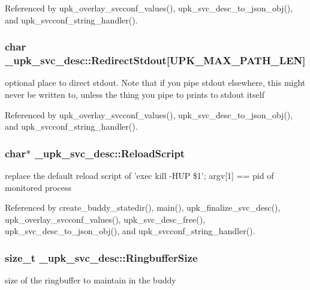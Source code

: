 Referenced by upk\_\-overlay\_\-svcconf\_\-values(), upk\_\-svc\_\-desc\_\-to\_\-json\_\-obj(), and upk\_\-svcconf\_\-string\_\-handler().

\subsubsection[{RedirectStdout}]{\setlength{\rightskip}{0pt plus 5cm}char {\bf \_\-upk\_\-svc\_\-desc::RedirectStdout}[UPK\_\-MAX\_\-PATH\_\-LEN]}\label{struct__upk__svc__desc_a2bfed4f3da2a85d7af160f64a70056dc}
optional place to direct stdout. Note that if you pipe stdout elsewhere, this might never be written to, unless the thing you pipe to prints to stdout itself 

Referenced by upk\_\-overlay\_\-svcconf\_\-values(), upk\_\-svc\_\-desc\_\-to\_\-json\_\-obj(), and upk\_\-svcconf\_\-string\_\-handler().

\subsubsection[{ReloadScript}]{\setlength{\rightskip}{0pt plus 5cm}char$\ast$ {\bf \_\-upk\_\-svc\_\-desc::ReloadScript}}\label{struct__upk__svc__desc_afa1e0a64af10238755e4c6716814be96}
replace the default reload script of 'exec kill -\/HUP \$1'; argv[1] == pid of monitored process 

Referenced by create\_\-buddy\_\-statedir(), main(), upk\_\-finalize\_\-svc\_\-desc(), upk\_\-overlay\_\-svcconf\_\-values(), upk\_\-svc\_\-desc\_\-free(), upk\_\-svc\_\-desc\_\-to\_\-json\_\-obj(), and upk\_\-svcconf\_\-string\_\-handler().

\subsubsection[{RingbufferSize}]{\setlength{\rightskip}{0pt plus 5cm}size\_\-t {\bf \_\-upk\_\-svc\_\-desc::RingbufferSize}}\label{struct__upk__svc__desc_a94b3cfd4efaec9179155f1acf97c415e}
size of the ringbuffer to maintain in the buddy 

